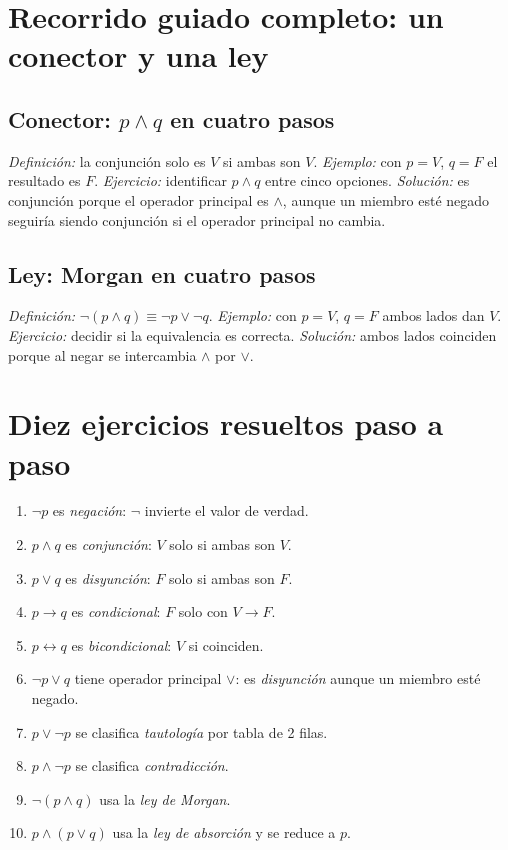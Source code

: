 \documentclass[11pt,a4paper,openany]{book}
\begin{document}
\chapter{Recorrido guiado completo: un conector y una ley}
\label{ch:walkthrough}
\section{Conector: $p \land q$ en cuatro pasos}
\textit{Definici\'on:} la conjunci\'on solo es $V$ si ambas son $V$. \textit{Ejemplo:} con $p = V$, $q = F$ el resultado es $F$. \textit{Ejercicio:} identificar $p \land q$ entre cinco opciones. \textit{Soluci\'on:} es conjunci\'on porque el operador principal es $\land$, aunque un miembro est\'e negado seguir\'ia siendo conjunci\'on si el operador principal no cambia.
\section{Ley: Morgan en cuatro pasos}
\textit{Definici\'on:} $\lnot(p \land q) \equiv \lnot p \lor \lnot q$. \textit{Ejemplo:} con $p = V$, $q = F$ ambos lados dan $V$. \textit{Ejercicio:} decidir si la equivalencia es correcta. \textit{Soluci\'on:} ambos lados coinciden porque al negar se intercambia $\land$ por $\lor$.

\chapter{Diez ejercicios resueltos paso a paso}
\label{ch:diez}
\begin{enumerate}[leftmargin=*]
\item $\lnot p$ es \textit{negaci\'on}: $\lnot$ invierte el valor de verdad.
\item $p \land q$ es \textit{conjunci\'on}: $V$ solo si ambas son $V$.
\item $p \lor q$ es \textit{disyunci\'on}: $F$ solo si ambas son $F$.
\item $p \to q$ es \textit{condicional}: $F$ solo con $V \to F$.
\item $p \leftrightarrow q$ es \textit{bicondicional}: $V$ si coinciden.
\item $\lnot p \lor q$ tiene operador principal $\lor$: es \textit{disyunci\'on} aunque un miembro est\'e negado.
\item $p \lor \lnot p$ se clasifica \textit{tautolog\'ia} por tabla de 2 filas.
\item $p \land \lnot p$ se clasifica \textit{contradicci\'on}.
\item $\lnot(p \land q)$ usa la \textit{ley de Morgan}.
\item $p \land (p \lor q)$ usa la \textit{ley de absorci\'on} y se reduce a $p$.
\end{enumerate}
\end{document}
